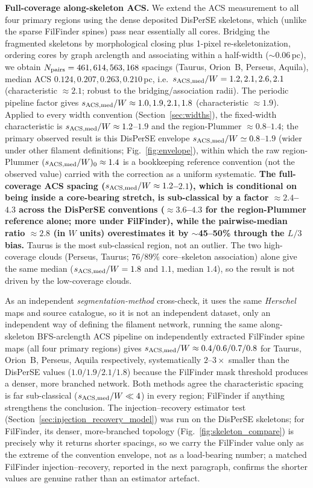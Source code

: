 \documentclass[usenatbib,twoside,twocolumn]{mnras}
\begin{document}
\textbf{Full-coverage along-skeleton ACS.} We extend the ACS measurement to all four primary regions using the dense deposited DisPerSE skeletons, which (unlike the sparse FilFinder spines) pass near essentially all cores. Bridging the fragmented skeletons by morphological closing plus 1-pixel re-skeletonization, ordering cores by graph arclength and associating within a half-width ($\sim$0.06\,pc), we obtain $N_{\rm pairs}=461,614,563,168$ spacings (Taurus, Orion~B, Perseus, Aquila), median ACS $0.124,0.207,0.263,0.210$\,pc, i.e.\ $s_{\rm ACS,med}/W=1.2,2.1,2.6,2.1$ (characteristic $\approx2.1$; robust to the bridging/association radii). The periodic pipeline factor gives $s_{\rm ACS,med}/W\approx1.0,1.9,2.1,1.8$ (characteristic $\approx1.9$). Applied to every width convention (Section~\ref{sec:widths}), the fixed-width characteristic is $s_{\rm ACS,med}/W\approx1.2$--$1.9$ and the region-Plummer $\approx0.8$--$1.4$; the primary observed result is this DisPerSE envelope $s_{\rm ACS,med}/W\simeq0.8$--$1.9$ (wider under other filament definitions; Fig.~\ref{fig:envelope}), within which the raw region-Plummer $(s_{\rm ACS,med}/W)_0\approx1.4$ is a bookkeeping reference convention (not the observed value) carried with the correction as a uniform systematic. \textbf{The full-coverage ACS spacing ($s_{\rm ACS,med}/W\approx1.2$--$2.1$), which is conditional on being inside a core-bearing stretch, is sub-classical by a factor $\approx2.4$--$4.3$ across the DisPerSE conventions ($\approx3.6$--$4.3$ for the region-Plummer reference alone; more under FilFinder), while the pairwise-median ratio $\approx2.8$ (in $W$ units) overestimates it by $\sim$45--50\% through the $L/3$ bias.} Taurus is the most sub-classical region, not an outlier. The two high-coverage clouds (Perseus, Taurus; $76/89\%$ core--skeleton association) alone give the same median ($s_{\rm ACS,med}/W=1.8$ and $1.1$, median $1.4$), so the result is not driven by the low-coverage clouds.

As an independent \emph{segmentation-method} cross-check, it uses the same \textit{Herschel} maps and source catalogue, so it is not an independent dataset, only an independent way of defining the filament network, running the same along-skeleton BFS-arclength ACS pipeline on independently extracted FilFinder spine maps (all four primary regions) gives $s_{\rm ACS,med}/W\approx0.4/0.6/0.7/0.8$ for Taurus, Orion~B, Perseus, Aquila respectively, systematically $2$--$3\times$ smaller than the DisPerSE values ($1.0/1.9/2.1/1.8$) because the FilFinder mask threshold produces a denser, more branched network. Both methods agree the characteristic spacing is far sub-classical ($s_{\rm ACS,med}/W\ll4$) in every region; FilFinder if anything strengthens the conclusion. The injection--recovery estimator test (Section~\ref{sec:injection_recovery_model}) was run on the DisPerSE skeletons; for FilFinder, its denser, more-branched topology (Fig.~\ref{fig:skeleton_compare}) is precisely why it returns shorter spacings, so we carry the FilFinder value only as the extreme of the convention envelope, not as a load-bearing number; a matched FilFinder injection--recovery, reported in the next paragraph, confirms the shorter values are genuine rather than an estimator artefact.
\end{document}
